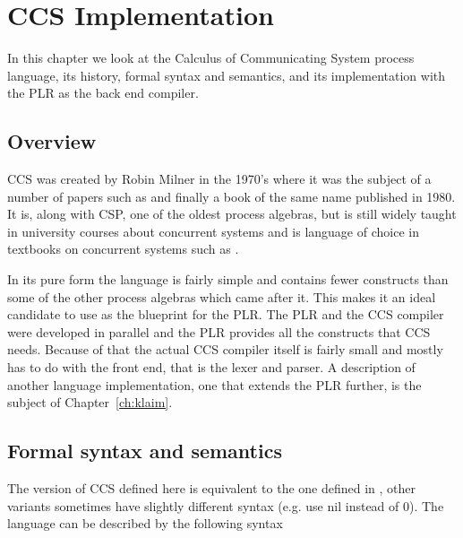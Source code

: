 \chapter{CCS Implementation}

	In this chapter we look at the Calculus of Communicating System process 
	language, its history, formal syntax and semantics, and its implementation 
	with the PLR as the back end compiler. 
	
\section{Overview}

	CCS was created by Robin Milner in the 1970's where it was the subject of a 
	number of papers such as \cite{milner1,milner2,milner3} and finally a book 
	of the same name \cite{Milner80} published in 1980. It is, along with CSP, 
	one of the oldest process algebras, but is still widely taught in university 
	courses about concurrent systems and is language of choice in textbooks on 
	concurrent systems such as \cite{reactive}. 
	
	In its pure form the language is fairly simple and contains fewer constructs 
	than some of the other process algebras which came after it. This makes it 
	an ideal candidate to use as the blueprint for the PLR. The PLR and the CCS 
	compiler were developed in parallel and the PLR provides all the constructs 
	that CCS needs. Because of that the actual CCS compiler itself is fairly 
	small and mostly has to do with the front end, that is the lexer and parser. 
	A description of another language implementation, one that extends the PLR 
	further, is the subject of Chapter~\ref{ch:klaim}.
	
\section{Formal syntax and semantics}\label{sec:ccs_syntax}

	The version of CCS defined here is equivalent to the one defined in 
	\cite{reactive}, other variants sometimes have slightly different syntax 
	(e.g. use \textsf{nil} instead of 0). The language can be described by the 
	following syntax


